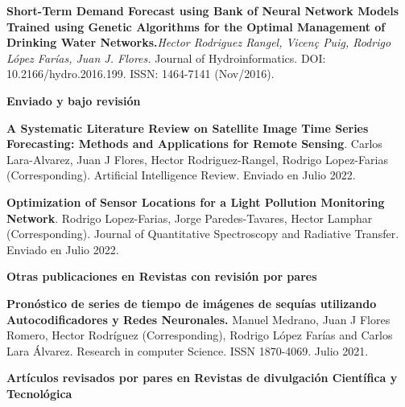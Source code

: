 \documentclass[10pt]{article}
\newenvironment{innerlist}[1][\enskip\textbullet]%
        {\begin{compactitem}[#1]}{\end{compactitem}}
\newcommand{\blankline}{\quad\pagebreak[2]}
\begin{document}
\begin{innerlist}
\item \textbf{Short-Term Demand Forecast using Bank of Neural Network Models Trained using Genetic Algorithms for the Optimal Management of Drinking Water Networks.}\textit{Hector Rodriguez Rangel, Vicen\c{c} Puig, Rodrigo López Farías, Juan J. Flores.}  {Journal of Hydroinformatics}. DOI: 10.2166/hydro.2016.199. ISSN: 1464-7141 (Nov/2016).

\blankline




\textbf{Enviado y bajo revisión}
\begin{innerlist}
\item \textbf{A Systematic Literature Review on Satellite Image Time Series Forecasting: Methods and Applications for Remote Sensing}. Carlos Lara-Alvarez, Juan J Flores, 
Hector Rodriguez-Rangel, Rodrigo Lopez-Farias (Corresponding). Artificial Intelligence Review. Enviado en Julio 2022.
\item  \textbf{Optimization of Sensor Locations for a Light Pollution Monitoring Network}.  Rodrigo Lopez-Farias, Jorge Paredes-Tavares, Hector Lamphar   (Corresponding).  Journal of Quantitative Spectroscopy and Radiative Transfer. Enviado en Julio 2022.
\end{innerlist}

\blankline


\textbf{Otras publicaciones en Revistas con revisión por pares}

\begin{innerlist}
\item \textbf{Pronóstico de series de tiempo de imágenes de sequías utilizando Autocodificadores y Redes Neuronales.} Manuel Medrano, Juan J Flores Romero, Hector Rodríguez (Corresponding), Rodrigo López Farías and Carlos Lara Álvarez. Research in computer Science. ISSN 1870-4069. Julio 2021.
\end{innerlist}

\blankline



\textbf{Artículos revisados por pares en Revistas de divulgación Científica y Tecnológica }


\end{innerlist}
\end{document}
